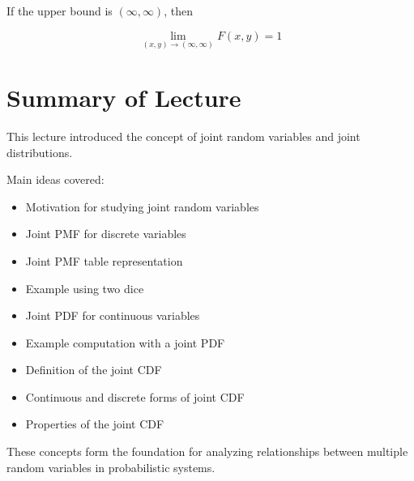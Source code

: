 \documentclass{article}
\begin{document}
If the upper bound is $(\infty,\infty)$, then

\[
\lim_{(x,y)\to(\infty,\infty)}F(x,y)=1
\]

\section{Summary of Lecture}

This lecture introduced the concept of joint random variables and joint distributions.

Main ideas covered:

\begin{itemize}
\item Motivation for studying joint random variables
\item Joint PMF for discrete variables
\item Joint PMF table representation
\item Example using two dice
\item Joint PDF for continuous variables
\item Example computation with a joint PDF
\item Definition of the joint CDF
\item Continuous and discrete forms of joint CDF
\item Properties of the joint CDF
\end{itemize}

These concepts form the foundation for analyzing relationships between multiple random variables in probabilistic systems.
\end{document}
